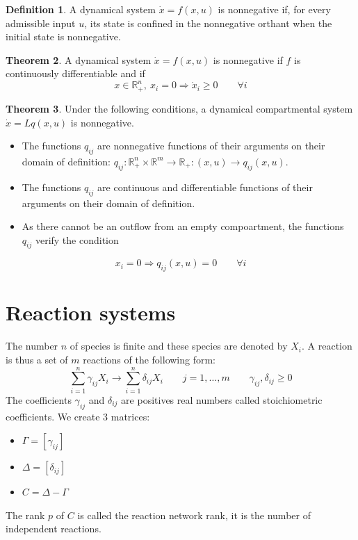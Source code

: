 \documentclass[12pt, openany]{report}
\theoremstyle{definition}
\newtheorem{thm}{Theorem}[chapter]
\newtheorem{definition}[thm]{Definition}
\newcommand{\R}{\mathbb{R}}
\begin{document}
\begin{definition}
    A dynamical system $\dot x=f(x,u)$ is nonnegative if, for every admissible input $u$, its state is confined in the nonnegative orthant when the initial state is nonnegative. 
\end{definition}
\begin{thm}
    A dynamical system $\dot x=f(x,u)$ is nonnegative if $f$ is continuously differentiable and if 
    \begin{equation}
        x\in \R^n_+, \: x_i=0\Longrightarrow \dot x_i\ge 0\qquad \forall i
    \end{equation}
\end{thm}
\begin{thm}
    Under the following conditions, a dynamical compartmental system $\dot x= Lq(x,u)$ is nonnegative.
    \begin{itemize}
        \item The functions $q_{ij}$ are nonnegative functions of their arguments on their domain of definition: $q_{ij}:\R^n_+\times \R^m\rightarrow \R_+: (x,u)\rightarrow q_{ij}(x,u)$.
        \item The functions $q_{ij}$ are continuous and differentiable functions of their arguments on their domain of definition.
        \item As there cannot be an outflow from an empty compoartment, the functions $q_{ij}$ verify the condition 
    \end{itemize}
    \begin{equation}
        x_i=0\Longrightarrow q_{ij}(x,u)=0\qquad \forall i
    \end{equation}
\end{thm}
\section{Reaction systems}
The number $n$ of species is finite and these species are denoted by $X_i$. A reaction is thus a set of $m$ reactions of the following form:
\begin{equation}
    \sum_{i=1}^n \gamma_{ij} X_i \rightarrow \sum_{i=1}^n\delta_{ij}X_i \qquad j = 1,\dots,m \qquad \gamma_{ij},\delta_{ij}\ge 0
\end{equation}
The coefficients $\gamma_{ij}$ and $\delta_{ij}$ are positives real numbers called stoichiometric coefficients. We create 3 matrices: 
\begin{itemize}
    \item $\Gamma = [\gamma_{ij}]$
    \item $\Delta = [\delta_{ij}]$
    \item $C = \Delta - \Gamma$
\end{itemize}
The rank $p$ of $C$ is called the reaction network rank, it is the number of independent reactions. 
\end{document}
